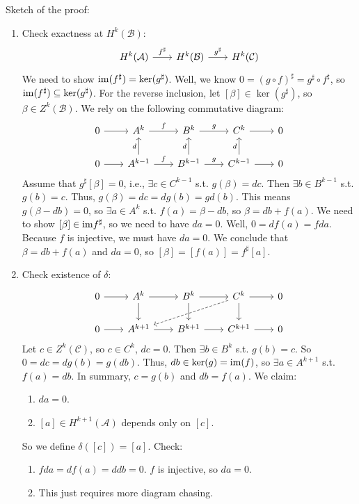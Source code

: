 \documentclass[10pt,letterpaper]{article}
\newcommand{\n}{\hfill\break}
\newcommand{\of}{\circ}
\newcommand{\im}{\textrm{\textnormal{im}}}
\newcommand{\st}{s.t.}
\begin{document}
\newpage
\par\noindent
Sketch of the proof:
\begin{enumerate}
	\item Check exactness at $H^{k}(\mathcal{B})$:
	\[
		\begin{tikzcd}[ampersand replacement=\&, column sep=20pt]
			H^{k}(\mathcal{A}) \arrow[r,"f^{\sharp}"] \& H^{k}(\mathcal{B}) \arrow[r,"g^{\sharp}"] \& H^{k}(\mathcal{C})
		\end{tikzcd}
	\]
	We need to show $\im(f^{\sharp})=\ker(g^{\sharp})$. Well, we know $0=(g\of{}f)^{\sharp}=g^{\sharp}\of{}f^{\sharp}$, so $\im(f^{\sharp})\subseteq\ker(g^{\sharp})$. For the reverse inclusion, let $[\beta]\in\ker(g^{\sharp})$, so $\beta\in{}Z^{k}(\mathcal{B})$. We rely on the following commutative diagram:
	\[
		\begin{tikzcd}[ampersand replacement=\&, column sep=20pt]
			0 \arrow[r] \& A^{k} \arrow[r,"f"] \& B^{k} \arrow[r,"g"] \& C^{k} \arrow[r] \& 0\\
			0 \arrow[r] \& A^{k-1} \arrow[u,"d"] \arrow[r,"f"] \& B^{k-1} \arrow[u,"d"] \arrow[r,"g"] \& C^{k-1} \arrow[u,"d"] \arrow[r] \& 0
		\end{tikzcd}
	\]
	Assume that $g^{\sharp}[\beta]=0$, i.e., $\exists{}c\in{}C^{k-1}$ \st{} $g(\beta)=dc$. Then $\exists{}b\in{}B^{k-1}$ \st{} $g(b)=c$.\n
	Thus, $g(\beta)=dc=dg(b)=gd(b)$. This means $g(\beta-db)=0$, so $\exists{}a\in{}A^{k}$ \st{} $f(a)=\beta-db$, so $\beta=db+f(a)$.\n
	We need to show $[\beta]\in\im{}f^{\sharp}$, so we need to have $da=0$. Well, $0=df(a)=fda$. Because $f$ is injective, we must have $da=0$. We conclude that $\beta=db+f(a)$ and $da=0$, so $[\beta]=[f(a)]=f^{\sharp}[a]$.\n
	\item Check existence of $\delta$:
	\[
		\begin{tikzcd}[ampersand replacement=\&, column sep=20pt]
			0 \arrow[r] \& A^{k} \arrow[r] \arrow[d] \& B^{k} \arrow[r] \arrow[d] \& C^{k} \arrow[r] \arrow[d] \arrow[lld, dashed] \& 0\\
			0 \arrow[r] \& A^{k+1} \arrow[r] \& B^{k+1} \arrow[r] \& C^{k+1} \arrow[r] \& 0
		\end{tikzcd}
	\]
	Let $c\in{}Z^{k}(\mathcal{C})$, so $c\in{}C^{k}$, $dc=0$. Then $\exists{}b\in{}B^{k}$ \st{} $g(b)=c$. So $0=dc=dg(b)=g(db)$. Thus, $db\in\ker(g)=\im(f)$, so $\exists{}a\in{}A^{k+1}$ \st{} $f(a)=db$. In summary, $c=g(b)$ and $db=f(a)$. We claim:
	\begin{enumerate}[label=(\roman*)]
		\item $da=0$.
		\item $[a]\in{}H^{k+1}(\mathcal{A})$ depends only on $[c]$.
	\end{enumerate}
	So we define $\delta([c])=[a]$. Check:
	\begin{enumerate}[label=(\roman*)]
		\item $fda=df(a)=ddb=0$. $f$ is injective, so $da=0$.
		\item This just requires more diagram chasing.
	\end{enumerate}
\end{enumerate}
\end{document}
